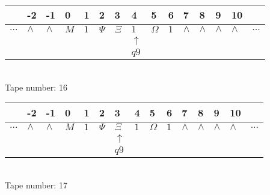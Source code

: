 \documentclass{article}
\begin{document}
\begin{table}[H]
\centering
\begin{tabular}{lllllllllllllll}
 & -2 & -1 & 0 & 1 & 2 & 3 & 4 & 5 & 6 & 7 & 8 & 9 & 10 & \\
\hline
$...$ & \multicolumn{1}{|l|}{$\wedge$} & \multicolumn{1}{|l|}{$\wedge$} & \multicolumn{1}{|l|}{$M$} & \multicolumn{1}{|l|}{$1$} & \multicolumn{1}{|l|}{$\Psi$} & \multicolumn{1}{|l|}{$\Xi$} & \multicolumn{1}{|l|}{$1$} & \multicolumn{1}{|l|}{$\Omega$} & \multicolumn{1}{|l|}{$1$} & \multicolumn{1}{|l|}{$\wedge$} & \multicolumn{1}{|l|}{$\wedge$} & \multicolumn{1}{|l|}{$\wedge$} & \multicolumn{1}{|l|}{$\wedge$} & $...$\\
\hline
&  &  &  &  &  &  & $\uparrow$ &  &  &  &  &  &  &  \\
&  &  &  &  &  &  & $ q9 $ &  &  &  &  &  &  &  \\
\end{tabular}
\\
Tape number: 16
\noindent\makebox[\linewidth]{\hdashrule{\textwidth}{1pt}{1pt}}\end{table}

\begin{table}[H]
\centering
\begin{tabular}{lllllllllllllll}
 & -2 & -1 & 0 & 1 & 2 & 3 & 4 & 5 & 6 & 7 & 8 & 9 & 10 & \\
\hline
$...$ & \multicolumn{1}{|l|}{$\wedge$} & \multicolumn{1}{|l|}{$\wedge$} & \multicolumn{1}{|l|}{$M$} & \multicolumn{1}{|l|}{$1$} & \multicolumn{1}{|l|}{$\Psi$} & \multicolumn{1}{|l|}{$\Xi$} & \multicolumn{1}{|l|}{$1$} & \multicolumn{1}{|l|}{$\Omega$} & \multicolumn{1}{|l|}{$1$} & \multicolumn{1}{|l|}{$\wedge$} & \multicolumn{1}{|l|}{$\wedge$} & \multicolumn{1}{|l|}{$\wedge$} & \multicolumn{1}{|l|}{$\wedge$} & $...$\\
\hline
&  &  &  &  &  & $\uparrow$ &  &  &  &  &  &  &  &  \\
&  &  &  &  &  & $ q9 $ &  &  &  &  &  &  &  &  \\
\end{tabular}
\\
Tape number: 17
\noindent\makebox[\linewidth]{\hdashrule{\textwidth}{1pt}{1pt}}\end{table}
\end{document}
